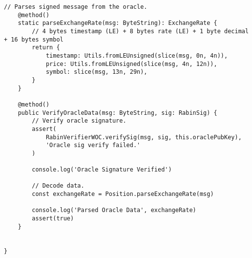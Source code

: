 \begin{lstlisting}[style=htmlcssjs, caption=Position Smart Contract]
    // Parses signed message from the oracle.
    @method()
    static parseExchangeRate(msg: ByteString): ExchangeRate {
        // 4 bytes timestamp (LE) + 8 bytes rate (LE) + 1 byte decimal + 16 bytes symbol
        return {
            timestamp: Utils.fromLEUnsigned(slice(msg, 0n, 4n)),
            price: Utils.fromLEUnsigned(slice(msg, 4n, 12n)),
            symbol: slice(msg, 13n, 29n),
        }
    }

    @method()
    public VerifyOracleData(msg: ByteString, sig: RabinSig) {
        // Verify oracle signature.
        assert(
            RabinVerifierWOC.verifySig(msg, sig, this.oraclePubKey),
            'Oracle sig verify failed.'
        )

        console.log('Oracle Signature Verified')

        // Decode data.
        const exchangeRate = Position.parseExchangeRate(msg)

        console.log('Parsed Oracle Data', exchangeRate)
        assert(true)
    }
    

}

\end{lstlisting}